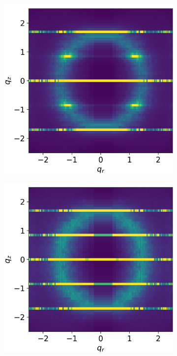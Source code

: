 \documentclass{article}
\begin{document}
  \begin{figure}[!ht]
	\centering
	\begin{subfigure}{0.475\textwidth}
		\hspace{-1.2cm}
		\centering
		\includegraphics[width=\textwidth,valign=t]{rzlayeredrestrained.png}
		\caption{}\label{fig:rzplayeredrestrained}
	\end{subfigure}
	\begin{subfigure}{0.475\textwidth}
		\hspace{-1.2cm}
		\centering
		\includegraphics[width=\textwidth,valign=t]{rzoffsetrestrained.png}

\end{subfigure}
\end{figure}
\end{document}
